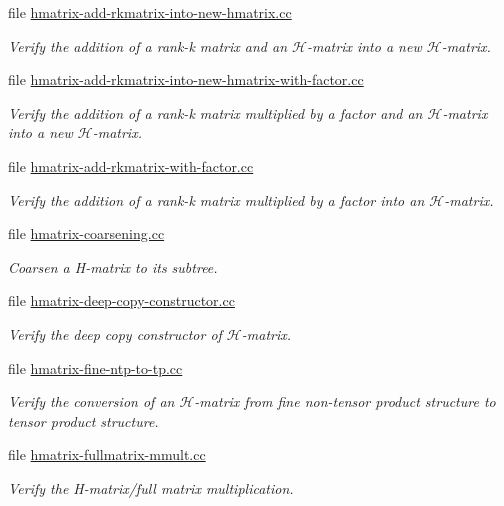 \begin{DoxyCompactItemize}
file \hyperlink{hmatrix-add-rkmatrix-into-new-hmatrix_8cc}{hmatrix-\/add-\/rkmatrix-\/into-\/new-\/hmatrix.\+cc}
\begin{DoxyCompactList}\small\item\em Verify the addition of a rank-\/k matrix and an $\mathcal{H}$-\/matrix into a new $\mathcal{H}$-\/matrix. \end{DoxyCompactList}\item 
file \hyperlink{hmatrix-add-rkmatrix-into-new-hmatrix-with-factor_8cc}{hmatrix-\/add-\/rkmatrix-\/into-\/new-\/hmatrix-\/with-\/factor.\+cc}
\begin{DoxyCompactList}\small\item\em Verify the addition of a rank-\/k matrix multiplied by a factor and an $\mathcal{H}$-\/matrix into a new $\mathcal{H}$-\/matrix. \end{DoxyCompactList}\item 
file \hyperlink{hmatrix-add-rkmatrix-with-factor_8cc}{hmatrix-\/add-\/rkmatrix-\/with-\/factor.\+cc}
\begin{DoxyCompactList}\small\item\em Verify the addition of a rank-\/k matrix multiplied by a factor into an $\mathcal{H}$-\/matrix. \end{DoxyCompactList}\item 
file \hyperlink{hmatrix-coarsening_8cc}{hmatrix-\/coarsening.\+cc}
\begin{DoxyCompactList}\small\item\em Coarsen a H-\/matrix to its subtree. \end{DoxyCompactList}\item 
file \hyperlink{hmatrix-deep-copy-constructor_8cc}{hmatrix-\/deep-\/copy-\/constructor.\+cc}
\begin{DoxyCompactList}\small\item\em Verify the deep copy constructor of $\mathcal{H}$-\/matrix. \end{DoxyCompactList}\item 
file \hyperlink{hmatrix-fine-ntp-to-tp_8cc}{hmatrix-\/fine-\/ntp-\/to-\/tp.\+cc}
\begin{DoxyCompactList}\small\item\em Verify the conversion of an $\mathcal{H}$-\/matrix from fine non-\/tensor product structure to tensor product structure. \end{DoxyCompactList}\item 
file \hyperlink{hmatrix-fullmatrix-mmult_8cc}{hmatrix-\/fullmatrix-\/mmult.\+cc}
\begin{DoxyCompactList}\small\item\em Verify the H-\/matrix/full matrix multiplication. \end{DoxyCompactList}\item 

\end{DoxyCompactItemize}
